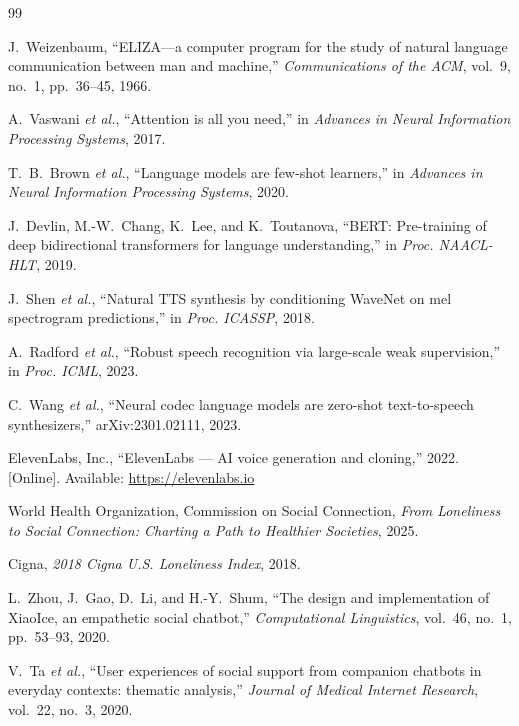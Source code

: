 \documentclass[11pt,a4paper]{report}
\begin{document}
\begin{thebibliography}{99}
\small

 J.~Weizenbaum, ``ELIZA---a computer program for the study of natural language communication between man and machine,'' \emph{Communications of the ACM}, vol.~9, no.~1, pp.~36--45, 1966.

 A.~Vaswani \emph{et al.}, ``Attention is all you need,'' in \emph{Advances in Neural Information Processing Systems}, 2017.

 T.~B.~Brown \emph{et al.}, ``Language models are few-shot learners,'' in \emph{Advances in Neural Information Processing Systems}, 2020.

 J.~Devlin, M.-W.~Chang, K.~Lee, and K.~Toutanova, ``BERT: Pre-training of deep bidirectional transformers for language understanding,'' in \emph{Proc. NAACL-HLT}, 2019.

 J.~Shen \emph{et al.}, ``Natural TTS synthesis by conditioning WaveNet on mel spectrogram predictions,'' in \emph{Proc. ICASSP}, 2018.

 A.~Radford \emph{et al.}, ``Robust speech recognition via large-scale weak supervision,'' in \emph{Proc. ICML}, 2023.

 C.~Wang \emph{et al.}, ``Neural codec language models are zero-shot text-to-speech synthesizers,'' arXiv:2301.02111, 2023.

 ElevenLabs, Inc., ``ElevenLabs --- AI voice generation and cloning,'' 2022. [Online]. Available: \url{https://elevenlabs.io}

 World Health Organization, Commission on Social Connection, \emph{From Loneliness to Social Connection: Charting a Path to Healthier Societies}, 2025.

 Cigna, \emph{2018 Cigna U.S. Loneliness Index}, 2018.

 L.~Zhou, J.~Gao, D.~Li, and H.-Y.~Shum, ``The design and implementation of XiaoIce, an empathetic social chatbot,'' \emph{Computational Linguistics}, vol.~46, no.~1, pp.~53--93, 2020.

 V.~Ta \emph{et al.}, ``User experiences of social support from companion chatbots in everyday contexts: thematic analysis,'' \emph{Journal of Medical Internet Research}, vol.~22, no.~3, 2020.


\end{thebibliography}
\end{document}
